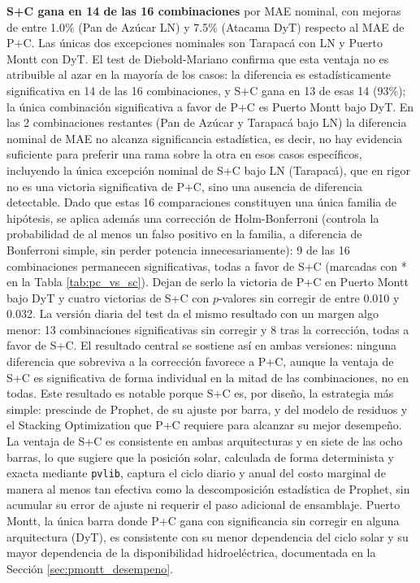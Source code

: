 \textbf{S+C gana en 14 de las 16 combinaciones} por MAE nominal, con mejoras de entre 1.0\% (Pan de Azúcar LN) y 7.5\% (Atacama DyT) respecto al MAE de P+C. Las únicas dos excepciones nominales son Tarapacá con LN y Puerto Montt con DyT. El test de Diebold-Mariano confirma que esta ventaja no es atribuible al azar en la mayoría de los casos: la diferencia es estadísticamente significativa en 14 de las 16 combinaciones, y S+C gana en 13 de esas 14 (93\%); la única combinación significativa a favor de P+C es Puerto Montt bajo DyT. En las 2 combinaciones restantes (Pan de Azúcar y Tarapacá bajo LN) la diferencia nominal de MAE no alcanza significancia estadística, es decir, no hay evidencia suficiente para preferir una rama sobre la otra en esos casos específicos, incluyendo la única excepción nominal de S+C bajo LN (Tarapacá), que en rigor no es una victoria significativa de P+C, sino una ausencia de diferencia detectable. Dado que estas 16 comparaciones constituyen una única familia de hipótesis, se aplica además una corrección de Holm-Bonferroni (controla la probabilidad de al menos un falso positivo en la familia, a diferencia de Bonferroni simple, sin perder potencia innecesariamente): 9 de las 16 combinaciones permanecen significativas, todas a favor de S+C (marcadas con * en la Tabla \ref{tab:pc_vs_sc}). Dejan de serlo la victoria de P+C en Puerto Montt bajo DyT y cuatro victorias de S+C con $p$-valores sin corregir de entre 0.010 y 0.032. La versión diaria del test da el mismo resultado con un margen algo menor: 13 combinaciones significativas sin corregir y 8 tras la corrección, todas a favor de S+C. El resultado central se sostiene así en ambas versiones: ninguna diferencia que sobreviva a la corrección favorece a P+C, aunque la ventaja de S+C es significativa de forma individual en la mitad de las combinaciones, no en todas. Este resultado es notable porque S+C es, por diseño, la estrategia más simple: prescinde de Prophet, de su ajuste por barra, y del modelo de residuos y el Stacking Optimization que P+C requiere para alcanzar su mejor desempeño. La ventaja de S+C es consistente en ambas arquitecturas y en siete de las ocho barras, lo que sugiere que la posición solar, calculada de forma determinista y exacta mediante \texttt{pvlib}, captura el ciclo diario y anual del costo marginal de manera al menos tan efectiva como la descomposición estadística de Prophet, sin acumular su error de ajuste ni requerir el paso adicional de ensamblaje. Puerto Montt, la única barra donde P+C gana con significancia sin corregir en alguna arquitectura (DyT), es consistente con su menor dependencia del ciclo solar y su mayor dependencia de la disponibilidad hidroeléctrica, documentada en la Sección \ref{sec:pmontt_desempeno}.

